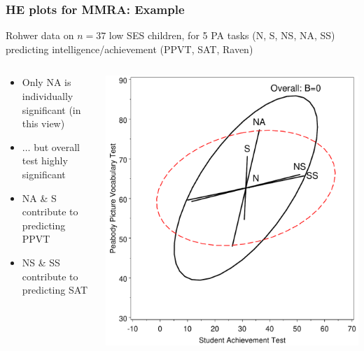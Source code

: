 \begin{frame}[plain]
  \frametitle{HE plots for MMRA: Example}
  \begin{itemize*}
	\item Rohwer data on $n=37$ low SES children, for 5 PA tasks (N, S, NS, NA, SS) predicting
	intelligence/achievement (PPVT, SAT, Raven)
  \end{itemize*}
  \begin{columns}
    \begin{column}[T]{.4\textwidth}
	  \begin{itemize}
	    \item<1-> Only NA is individually significant (in this view)
		\item<1-> $\dots$ but overall test highly significant
		\item<2-> NA \& S contribute to predicting PPVT
		\item<2-> NS \& SS contribute to predicting SAT
	  \end{itemize}
    \end{column}
    \begin{column}[T]{.6\textwidth}
	  \includegraphics[width=.85\textwidth,clip]{fig/mreg6}
    \end{column}
  \end{columns}
\end{frame}

